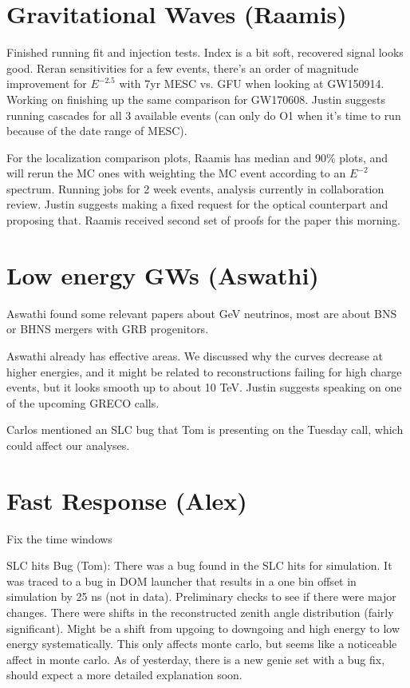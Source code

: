 \section{Gravitational Waves (Raamis)}
Finished running fit and injection tests. Index is a bit soft, recovered signal looks good. Reran sensitivities for a few events, there's an order of magnitude improvement for $E^{-2.5}$ with 7yr MESC vs. GFU when looking at GW150914. Working on finishing up the same comparison for GW170608. Justin suggests running cascades for all 3 available events (can only do O1 when it's time to run because of the date range of MESC).

For the localization comparison plots, Raamis has median and 90\% plots, and will rerun the MC ones with weighting the MC event according to an $E^{-2}$ spectrum. Running jobs for 2 week events, analysis currently in collaboration review. Justin suggests making a fixed request for the optical counterpart and proposing that. Raamis received second set of proofs for the paper this morning. 

\section{Low energy GWs (Aswathi)}
Aswathi found some relevant papers about GeV neutrinos, most are about BNS or BHNS mergers with GRB progenitors. 

Aswathi already has effective areas. We discussed why the curves decrease at higher energies, and it might be related to reconstructions failing for high charge events, but it looks smooth up to about 10 TeV. Justin suggests speaking on one of the upcoming GRECO calls. 

Carlos mentioned an SLC bug that Tom is presenting on the Tuesday call, which could affect our analyses.

\section{Fast Response (Alex)}
Fix the time windows

SLC hits Bug (Tom): There was a bug found in the SLC hits for simulation. It was traced to a bug in DOM launcher that results in a one bin offset in simulation by 25 ns (not in data). Preliminary checks to see if there were major changes. There were shifts in the reconstructed zenith angle distribution (fairly significant). Might be a shift from upgoing to downgoing and high energy to low energy systematically. This only affects monte carlo, but seems like a noticeable affect in monte carlo. As of yesterday, there is a new genie set with a bug fix, should expect a more detailed explanation soon. 

